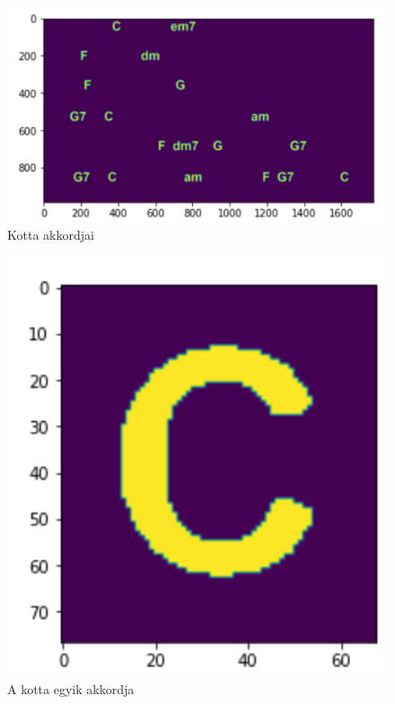 \begin{figure}[h]
	\includegraphics[scale=0.5]{images/output_justchords.png}
	\caption{Kotta akkordjai}
	\label{fig:output2}
\end{figure}

\begin{figure}[h]
	\includegraphics[scale=0.5]{images/output_single_character.png}
	\caption{A kotta egyik akkordja}
	\label{fig:output3}
\end{figure}


